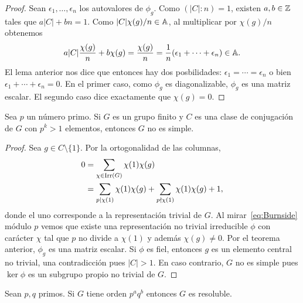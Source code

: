 \begin{proof}
	Sean $\epsilon_1,\dots,\epsilon_n$ los autovalores de $\phi_g$. Como
	$(|C|:n)=1$, existen $a,b\in\mathbb{Z}$ tales que $a|C|+bn=1$.  Como
	$|C|\chi(g)/n\in\mathbb{A}$, al multiplicar por $\chi(g)/n$ obtenemos 
	\[
		a|C|\frac{\chi(g)}{n}+b\chi(g)=\frac{\chi(g)}{n}=\frac{1}{n}(\epsilon_1+\cdots+\epsilon_n)\in\mathbb{A}.
	\]
	El lema anterior nos dice que entonces hay dos posbilidades:
	$\epsilon_1=\cdots=\epsilon_n$ o bien $\epsilon_1+\cdots+\epsilon_n=0$. En
	el primer caso, como $\phi_g$ es diagonalizable, $\phi_g$ es una matriz
	escalar. El segundo caso dice exactamente que $\chi(g)=0$.
\end{proof}

\begin{theorem}[Burnside]
  Sea $p$ un número primo. Si $G$ es un grupo finito y $C$ es una clase de
  conjugación de $G$ con $p^k>1$ elementos, entonces $G$ no es simple.
\end{theorem}

\begin{proof}
	Sea $g\in C\setminus\{1\}$. Por la ortogonalidad de las columnas, 
	\begin{equation}
	\label{eq:Burnside}
	\begin{aligned}
		0&=\sum_{\chi\in\operatorname{Irr}(G)}\chi(1)\chi(g)\\
		&=\sum_{p\mid\chi(1)}\chi(1)\chi(g)+\sum_{p\nmid\chi(1)}\chi(1)\chi(g)+1,
	\end{aligned}
	\end{equation}
	donde el uno corresponde a la representación trivial de $G$. Al
	mirar~\eqref{eq:Burnside} módulo $p$ vemos que existe una representación no
	trivial irreducible $\phi$ con carácter $\chi$ tal que $p$ no divide a
	$\chi(1)$ y además $\chi(g)\ne0$. Por el teorema anterior, $\phi_g$ es una
	matriz escalar. Si $\phi$ es fiel, entonces $g$ es un elemento central no
	trivial, una contradicción pues $|C|>1$. En caso contrario, $G$ no es simple pues
	$\ker\phi$ es un subgrupo propio no trivial de $G$.
\end{proof}

\begin{theorem}[Burnside]
  Sean $p,q$ primos. Si $G$ tiene orden $p^aq^b$ entonces $G$ es resoluble.
\end{theorem}

